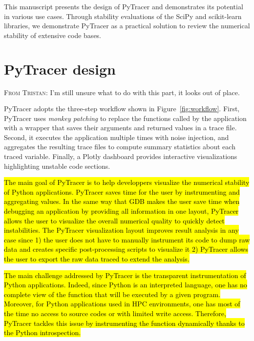 \documentclass[10pt,journal,compsoc]{IEEEtran}
\newcommand{\pytracer}[0]{PyTracer\xspace}
\DeclareRobustCommand{\add}[1]{\sethlcolor{lightgreen}\hl{#1}}
\newcommand{\TG}[1]{\color{red}\textsc{From Tristan}: #1\xspace\color{black}}
\DeclareRobustCommand{\add}[1]{#1}
\newcommand{\TG}[1]{}
\begin{document}
This manuscript presents the design of \pytracer and demonstrates its potential
in various use cases. Through stability evaluations of the SciPy and
scikit-learn libraries, we demonstrate \pytracer as a practical solution to
review the numerical stability of extensive code bases. 

\section{\pytracer design}

\TG{I'm still unsure what to do with this part, it looks out of place.}

\pytracer adopts the three-step workflow shown in Figure~\ref{fig:workflow}.
First, \pytracer uses \textit{monkey patching} to replace the functions called
by the application with a wrapper that saves their arguments and returned values
in a trace file.
Second, it executes the application multiple times with noise injection, and
aggregates the resulting trace files to compute summary statistics about each
traced variable. Finally, a Plotly dashboard provides interactive visualizations
highlighting unstable code sections.


\add{
    The main goal of PyTracer is to help developpers visualize the numerical
    stability of Python applications. PyTracer saves time for the user by
    instrumenting and aggregating values. In the same way that GDB makes the user
    save time when debugging an application by providing all information in one
    layout, PyTracer allows the user to visualize the overall numerical quality to
    quickly detect instabilities. The PyTracer visualization layout improves result
    analysis in any case since 1) the user does not have to manually instrument its
    code to dump raw data and creates specific post-processing scripts to visualize
    it 2) PyTracer allows the user to export the raw data traced to extend the
    analysis. 
}

\add{
    The main challenge addressed by PyTracer is the transparent instrumentation of Python 
    applications. Indeed, since Python is an interpreted language, one has no complete 
    view of the function that will be executed by a given program. 
    Moreover, for Python applications used in HPC environments, one has
    most of the time no access to source codes or with limited write access.
    Therefore, PyTracer tackles this issue by instrumenting the function dynamically 
    thanks to the Python introspection.
}
\end{document}
